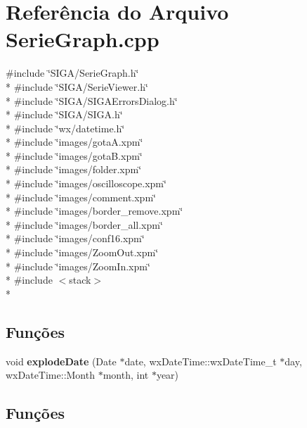 \section{Referência do Arquivo Serie\+Graph.\+cpp}
\label{_serie_graph_8cpp}
{\ttfamily \#include \char`\"{}S\+I\+G\+A/\+Serie\+Graph.\+h\char`\"{}}\\*
{\ttfamily \#include \char`\"{}S\+I\+G\+A/\+Serie\+Viewer.\+h\char`\"{}}\\*
{\ttfamily \#include \char`\"{}S\+I\+G\+A/\+S\+I\+G\+A\+Errors\+Dialog.\+h\char`\"{}}\\*
{\ttfamily \#include \char`\"{}S\+I\+G\+A/\+S\+I\+G\+A.\+h\char`\"{}}\\*
{\ttfamily \#include \char`\"{}wx/datetime.\+h\char`\"{}}\\*
{\ttfamily \#include \char`\"{}images/gota\+A.\+xpm\char`\"{}}\\*
{\ttfamily \#include \char`\"{}images/gota\+B.\+xpm\char`\"{}}\\*
{\ttfamily \#include \char`\"{}images/folder.\+xpm\char`\"{}}\\*
{\ttfamily \#include \char`\"{}images/oscilloscope.\+xpm\char`\"{}}\\*
{\ttfamily \#include \char`\"{}images/comment.\+xpm\char`\"{}}\\*
{\ttfamily \#include \char`\"{}images/border\+\_\+remove.\+xpm\char`\"{}}\\*
{\ttfamily \#include \char`\"{}images/border\+\_\+all.\+xpm\char`\"{}}\\*
{\ttfamily \#include \char`\"{}images/conf16.\+xpm\char`\"{}}\\*
{\ttfamily \#include \char`\"{}images/\+Zoom\+Out.\+xpm\char`\"{}}\\*
{\ttfamily \#include \char`\"{}images/\+Zoom\+In.\+xpm\char`\"{}}\\*
{\ttfamily \#include $<$stack$>$}\\*
\subsection*{Funções}
\begin{DoxyCompactItemize}
\item 
void {\bf explode\+Date} (Date $\ast$date, wx\+Date\+Time\+::wx\+Date\+Time\+\_\+t $\ast$day, wx\+Date\+Time\+::\+Month $\ast$month, int $\ast$year)
\end{DoxyCompactItemize}


\subsection{Funções}
